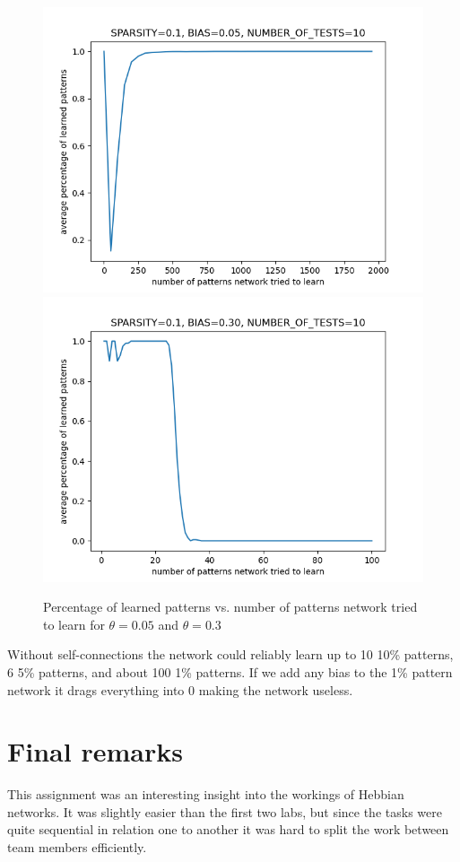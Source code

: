 \documentclass[a4paper]{article}
\begin{document}
\begin{figure}[h]
    \centering
    \includegraphics[width=.49\linewidth]{img/sparsity=0.1_bias=0.05000.png}
    \includegraphics[width=.49\linewidth]{img/sparsity=0.1_bias=0.30000.png}
    \caption{Percentage of learned patterns vs. number of patterns network tried to learn for $\theta = 0.05$ and $\theta = 0.3$}
    \label{fig:saturation}
\end{figure}

Without self-connections the network could reliably learn up to 10 10\% patterns, 6 5\% patterns, and about 100 1\% patterns. If we add any bias to the 1\% pattern network it drags everything into 0 making the network useless.

\section{Final remarks}
This assignment was an interesting insight into the workings of Hebbian networks. It was slightly easier than the first two labs, but since the tasks were quite sequential in relation one to another it was hard to split the work between team members efficiently. 
\end{document}
